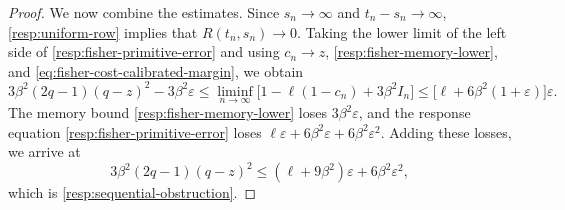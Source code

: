 \begin{proof}
We now combine the estimates. Since $s_n\to\infty$ and $t_n-s_n\to\infty$, \cref{resp:uniform-row} implies that $R(t_n,s_n)\to0$. Taking the lower limit of the left side of \eqref{resp:fisher-primitive-error} and using $c_n\to z$, \eqref{resp:fisher-memory-lower}, and \eqref{eq:fisher-cost-calibrated-margin}, we obtain
\[
 3\beta^2(2q-1)(q-z)^2-3\beta^2\varepsilon
 \le\liminf_{n\to\infty}\bigl[1-\ell(1-c_n)+3\beta^2I_n\bigr]
 \le\bigl[\ell+6\beta^2(1+\varepsilon)\bigr]\varepsilon .
\]
The memory bound \eqref{resp:fisher-memory-lower} loses $3\beta^2\varepsilon$, and the response equation \eqref{resp:fisher-primitive-error} loses $\ell\varepsilon+6\beta^2\varepsilon+6\beta^2\varepsilon^2$. Adding these losses, we arrive at
\[
 3\beta^2(2q-1)(q-z)^2\le(\ell+9\beta^2)\varepsilon+6\beta^2\varepsilon^2,
\]
which is \eqref{resp:sequential-obstruction}.
\end{proof}

